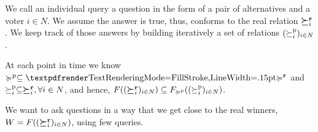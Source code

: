 \documentclass[version=last, pagesize, twoside=off, bibliography=totoc, DIV=calc, fontsize=14pt, a4paper, french, english]{scrartcl}
\begin{document}
We call an individual query a question in the form of a pair of alternatives and a voter $i \in N$. We assume the answer is true, thus, conforms to the real relation $\boldsymbol{\succeq}^\textbf{r}_i$. We keep track of those answers by building iteratively a set of relations $(\succeq_i^\text{p})_{i \in N}$.

At each point in time we know $\pprefsv \subseteq \prefsv$ and $\succeq^\text{p}_i \subseteq \boldsymbol{\succeq}^\textbf{r}_i, \forall i \in N$, and hence, $F((\boldsymbol{\succeq}^\textbf{r}_i)_{i \in N}) \subseteq F_{\succcurlyeq^\text{p}}((\succeq_i^\text{p})_{i \in N})$.

We want to ask questions in a way that we get close to the real winners, $W = F((\boldsymbol{\succeq}^\textbf{r}_i)_{i \in N})$, using few queries.


\end{document}
